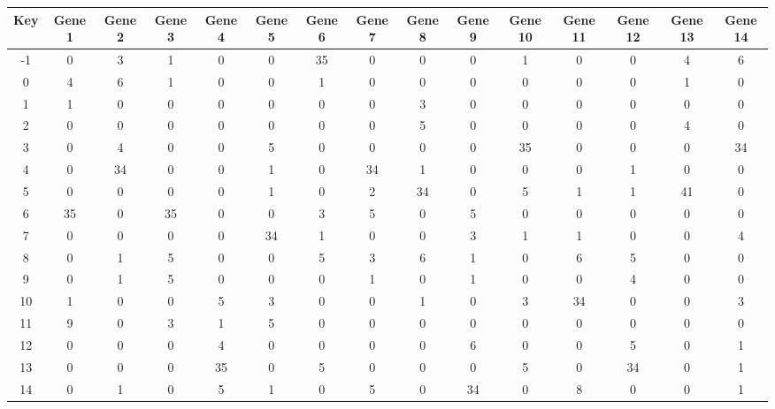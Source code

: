 \begin{tabular}{|c|c|c|c|c|c|c|c|c|c|c|c|c|c|c|}
\hline
Key & Gene 1 & Gene 2 & Gene 3 & Gene 4 & Gene 5 & Gene 6 & Gene 7 & Gene 8 & Gene 9 & Gene 10 & Gene 11 & Gene 12 & Gene 13 & Gene 14 \\
\hline
-1 & 0 & 3 & 1 & 0 & 0 & 35 & 0 & 0 & 0 & 1 & 0 & 0 & 4 & 6 \\
0 & 4 & 6 & 1 & 0 & 0 & 1 & 0 & 0 & 0 & 0 & 0 & 0 & 1 & 0 \\
1 & 1 & 0 & 0 & 0 & 0 & 0 & 0 & 3 & 0 & 0 & 0 & 0 & 0 & 0 \\
2 & 0 & 0 & 0 & 0 & 0 & 0 & 0 & 5 & 0 & 0 & 0 & 0 & 4 & 0 \\
3 & 0 & 4 & 0 & 0 & 5 & 0 & 0 & 0 & 0 & 35 & 0 & 0 & 0 & 34 \\
4 & 0 & 34 & 0 & 0 & 1 & 0 & 34 & 1 & 0 & 0 & 0 & 1 & 0 & 0 \\
5 & 0 & 0 & 0 & 0 & 1 & 0 & 2 & 34 & 0 & 5 & 1 & 1 & 41 & 0 \\
6 & 35 & 0 & 35 & 0 & 0 & 3 & 5 & 0 & 5 & 0 & 0 & 0 & 0 & 0 \\
7 & 0 & 0 & 0 & 0 & 34 & 1 & 0 & 0 & 3 & 1 & 1 & 0 & 0 & 4 \\
8 & 0 & 1 & 5 & 0 & 0 & 5 & 3 & 6 & 1 & 0 & 6 & 5 & 0 & 0 \\
9 & 0 & 1 & 5 & 0 & 0 & 0 & 1 & 0 & 1 & 0 & 0 & 4 & 0 & 0 \\
10 & 1 & 0 & 0 & 5 & 3 & 0 & 0 & 1 & 0 & 3 & 34 & 0 & 0 & 3 \\
11 & 9 & 0 & 3 & 1 & 5 & 0 & 0 & 0 & 0 & 0 & 0 & 0 & 0 & 0 \\
12 & 0 & 0 & 0 & 4 & 0 & 0 & 0 & 0 & 6 & 0 & 0 & 5 & 0 & 1 \\
13 & 0 & 0 & 0 & 35 & 0 & 5 & 0 & 0 & 0 & 5 & 0 & 34 & 0 & 1 \\
14 & 0 & 1 & 0 & 5 & 1 & 0 & 5 & 0 & 34 & 0 & 8 & 0 & 0 & 1 \\
\hline
\end{tabular}
